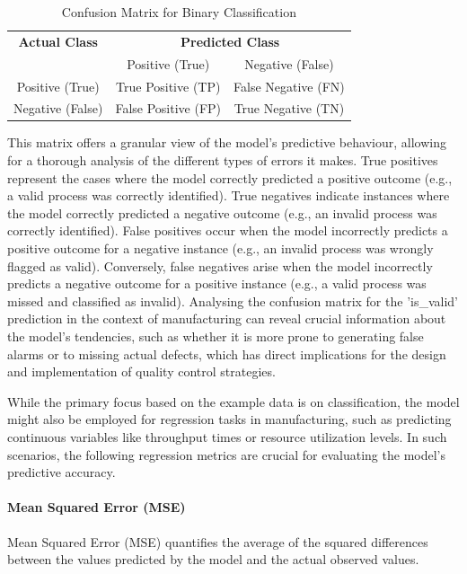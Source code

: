 \begin{table}[h!]
  \centering
  \caption{Confusion Matrix for Binary Classification}
  \label{tab:confusionmatrix}
  \begin{tabular}{c|cc}
    \toprule
    \textbf{Actual Class} & \multicolumn{2}{c}{\textbf{Predicted Class}}                       \\
                          & Positive (True)                              & Negative (False)    \\
    \midrule
    Positive (True)       & True Positive (TP)                           & False Negative (FN) \\
    Negative (False)      & False Positive (FP)                          & True Negative (TN)  \\
    \bottomrule
  \end{tabular}
\end{table}

This matrix offers a granular view of the model's predictive behaviour, allowing for a thorough analysis of the different types of errors it makes. True positives represent the cases where the model correctly predicted a positive outcome (e.g., a valid process was correctly identified). True negatives indicate instances where the model correctly predicted a negative outcome (e.g., an invalid process was correctly identified). False positives occur when the model incorrectly predicts a positive outcome for a negative instance (e.g., an invalid process was wrongly flagged as valid). Conversely, false negatives arise when the model incorrectly predicts a negative outcome for a positive instance (e.g., a valid process was missed and classified as invalid). Analysing the confusion matrix for the 'is\_valid' prediction in the context of manufacturing can reveal crucial information about the model's tendencies, such as whether it is more prone to generating false alarms or to missing actual defects, which has direct implications for the design and implementation of quality control strategies.

While the primary focus based on the example data is on classification, the model might also be employed for regression tasks in manufacturing, such as predicting continuous variables like throughput times or resource utilization levels. In such scenarios, the following regression metrics are crucial for evaluating the model's predictive accuracy.

\paragraph{\textbf{Mean Squared Error (MSE)}}
Mean Squared Error (MSE) quantifies the average of the squared differences between the values predicted by the model and the actual observed values.

